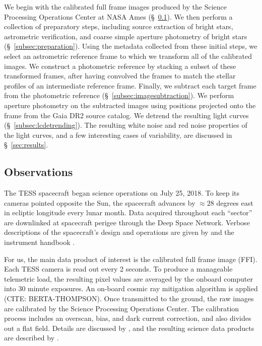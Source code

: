\documentclass[12pt,twocolumn,tighten]{aastex62}
\begin{document}
We begin with the calibrated full frame images produced by the Science
Processing Operations Center at NASA Ames (\S~\ref{subsec:observations}).
We then perform a collection of
preparatory steps, including source extraction of bright stars,
astrometric verification, and coarse simple aperture
photometry of bright stars (\S~\ref{subsec:preparation}).  Using the metadata
collected from these initial steps, we select an astrometric reference frame to
which we transform all of the calibrated images.  We construct a
photometric reference by stacking a subset of these transformed frames, after
having convolved the frames to match the stellar profiles of an intermediate
reference frame. Finally, we
subtract each target frame from the photometric reference (\S~\ref{subsec:imagesubtraction}).
We perform aperture
photometry on the subtracted images using positions projected onto the
frame from the Gaia DR2 source catalog.  
We detrend the resulting light curves
(\S~\ref{subsec:lcdetrending}).  The resulting white noise and red noise properties
of the light curves, and a few
interesting cases of variability, are discussed in \S~\ref{sec:results}.



\subsection{Observations}
\label{subsec:observations}


The TESS spacecraft began science operations on July 25, 2018.  To
keep its cameras pointed opposite the Sun, the spacecraft advances by
$\approx$$28$ degrees east in ecliptic longitude every lunar month.  Data
acquired throughout each ``sector'' are downlinked at spacecraft
perigee through the Deep Space Network.  Verbose descriptions of the
spacecraft's design and operations are given by
\citet{ricker_transiting_2015} and the instrument handbook
\citep{vanderspek_2018}.

For us, the main data product of interest is the calibrated full frame
image (FFI).  Each TESS camera is read out every 2 seconds.  To produce
a manageable telemetric load, the resulting pixel values are averaged
by the onboard computer into 30 minute exposures. An on-board cosmic
ray mitigation algorithm is applied (CITE: BERTA-THOMPSON). Once
transmitted to the ground, the raw images are calibrated by the
Science Processing Operations Center.  The calibration process
includes an overscan, bias, and dark current correction, and also
divides out a flat field.  Details are discussed by
\citet{clarke_kepler_2017}, and the resulting science data products
are described by \citet{tess_data_product_description_2018}.
\end{document}
